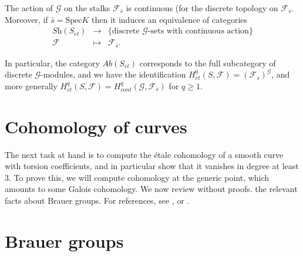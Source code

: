 \begin{theorem}
\label{theorem-equivalence-sheaves-point}
The action of $\mathcal{G}$ on the stalks $\mathcal{F}_{\bar s}$ is continuous
(for the discrete topology on $\mathcal{F}_{\bar s}$. Moreover, if $\bar s=
\text{Spec} K$ then it induces an equivalence of categories
$$
\begin{matrix}
\textit{Sh}(S_{et}) & \longrightarrow & \{ \text{discrete $\mathcal{G}$-sets
with continuous action} \} \\
\mathcal{F} & \longmapsto & \mathcal{F}_{\bar s}.
\end{matrix}
$$
\end{theorem}

\noindent
In particular, the category $\textit{Ab}(S_{et})$ corresponds to the full
subcategory of discrete $\mathcal{G}$-modules, and we have the identification
$H_{et}^0(S,\mathcal{F}) = (\mathcal{F}_{\bar s})^\mathcal{G}$, and more
generally $H_{et}^q(S,\mathcal{F}) = H_{cont}^q (\mathcal{G}, \mathcal{F}_{\bar
s})$ for $q \geq 1$.





\section{Cohomology of curves}
\label{section-cohomology-curves}

\noindent
The next task at hand is to compute the \'etale cohomology of a smooth curve
with torsion coefficients, and in particular show that it vanishes in degree at
least 3. To prove this, we will compute cohomology at the generic point, which
amounts to some Galois cohomology. We now review without proofs. the relevant
facts about Brauer groups. For references, see \cite{SerreCorpsLocaux},
\cite{SerreGaloisCohomology} or \cite{Weil}.




\section{Brauer groups}
\label{section-brauer-groups}

